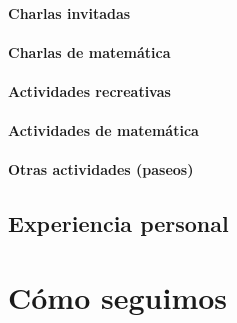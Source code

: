 \paragraph{Charlas invitadas}
\paragraph{Charlas de matem\'atica}
\paragraph{Actividades recreativas}
\paragraph{Actividades de matem\'atica}
\paragraph{Otras actividades (paseos)}

\subsection{Experiencia personal}

\section{C\'omo seguimos}

